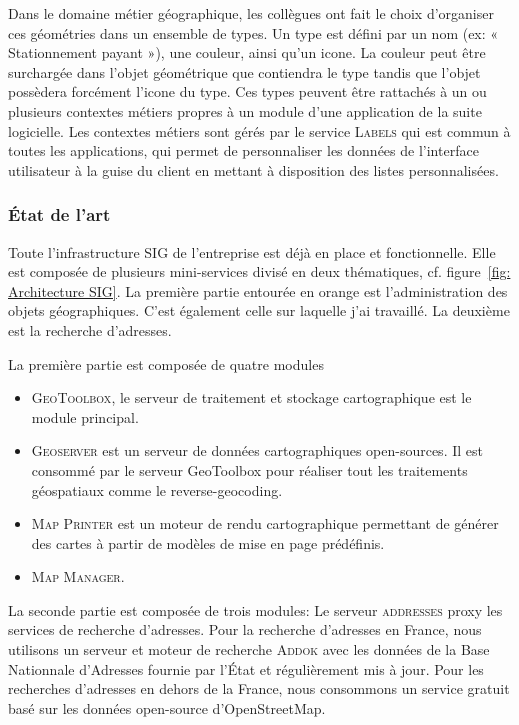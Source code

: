 \documentclass{rapportUHA40}
\begin{document}
Dans le domaine métier géographique, les collègues ont fait le choix
d'organiser ces géométries dans un ensemble de types. Un type est défini par un
nom (ex: « Stationnement payant »), une couleur, ainsi qu'un icone. La couleur
peut être surchargée dans l'objet géométrique que contiendra le type tandis que
l'objet possèdera forcément l'icone du type. Ces types peuvent être rattachés à
un ou plusieurs contextes métiers propres à un module d'une application de la
suite logicielle. Les contextes métiers sont gérés par le service
\textsc{Labels} qui est commun à toutes les applications, qui permet de
personnaliser les données de l'interface utilisateur à la guise du client en
mettant à disposition des listes personnalisées.

\subsubsection{État de l'art}
Toute l'infrastructure SIG de l'entreprise est déjà en place et fonctionnelle.
Elle est composée de plusieurs mini-services divisé en deux thématiques, cf.
figure~\ref{fig: Architecture SIG}. La première partie entourée en orange est
l'administration des objets géographiques. C'est également celle sur laquelle
j'ai travaillé. La deuxième est la recherche d'adresses.

La première partie est composée de quatre modules
\begin{itemize}
  \item \textsc{GeoToolbox}, le serveur de
        traitement et stockage cartographique est le module principal.
  \item \textsc{Geoserver} est un serveur de données cartographiques open-sources.
        Il est consommé par le serveur GeoToolbox pour réaliser tout les traitements
        géospatiaux comme le \gls{reverse-geocoding}.
  \item \textsc{Map Printer} est un moteur de rendu cartographique permettant de générer
        des cartes à partir de modèles de mise en page prédéfinis.
  \item \textsc{Map Manager}.
\end{itemize}

La seconde partie est composée de trois modules: Le serveur \textsc{addresses}
\gls{proxy} les services de recherche d'adresses. Pour la recherche d'adresses
en France, nous utilisons un serveur et moteur de recherche \textsc{Addok} avec
les données de la Base Nationnale d'Adresses fournie par l'État et
régulièrement mis à jour. Pour les recherches d'adresses en dehors de la
France, nous consommons un service gratuit basé sur les données open-source
d'OpenStreetMap.
\end{document}
